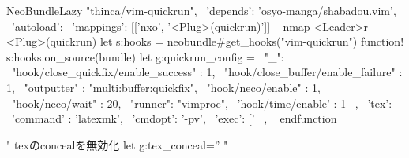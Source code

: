 NeoBundleLazy "thinca/vim-quickrun",  {
  \ 'depends': 'osyo-manga/shabadou.vim',
    \ 'autoload': {
      \   'mappings': [['nxo',  '<Plug>(quickrun)']]
        \ }}
nmap <Leader>r <Plug>(quickrun)
  let s:hooks = neobundle#get_hooks("vim-quickrun")
function! s:hooks.on_source(bundle)
  let g:quickrun_config = {
    \   "_": {
      \     "hook/close_quickfix/enable_success" : 1,
      \     "hook/close_buffer/enable_failure" : 1,
      \     "outputter" : "multi:buffer:quickfix",
      \     "hook/neco/enable" : 1,
      \     "hook/neco/wait" : 20,
      \     "runner": "vimproc",
      \     'hook/time/enable' : 1
        \   },
    \   'tex':{
      \     'command' : 'latexmk',
      \     'cmdopt': '-pv',
      \     'exec': ['%
        \   },
    \ }
    endfunction

    " texのconcealを無効化
    let g:tex_conceal='' "
